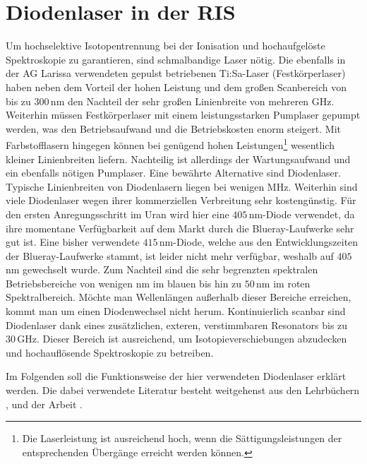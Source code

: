 \section{Diodenlaser in der RIS}\label{sec:diodenlaser}
Um hochselektive Isotopentrennung bei der Ionisation und hochaufgelöste
Spektroskopie zu garantieren, sind schmalbandige Laser nötig. Die ebenfalls in
der AG Larissa verwendeten gepulst betriebenen Ti:Sa-Laser (Festkörperlaser)
haben neben dem Vorteil der hohen Leistung und dem großen Scanbereich von bis
zu $300\,$nm den Nachteil der sehr großen Linienbreite von mehreren GHz.
Weiterhin müssen Festkörperlaser mit einem leistungsstarken Pumplaser gepumpt
werden, was den Betriebsaufwand und die Betriebskosten enorm steigert.
Mit Farbstofflasern hingegen können bei genügend hohen
Leistungen\footnote{Die Laserleistung ist ausreichend hoch, wenn die
Sättigungsleistungen der entsprechenden Übergänge erreicht werden können.}
wesentlich kleiner Linienbreiten liefern. Nachteilig ist allerdings der
Wartungsaufwand und ein ebenfalls nötigen Pumplaser. Eine bewährte Alternative
sind Diodenlaser. Typische Linienbreiten von Diodenlasern liegen bei wenigen
MHz. Weiterhin sind viele Diodenlaser wegen ihrer
kommerziellen Verbreitung sehr kostengünstig. Für den ersten Anregungsschritt im
Uran wird hier eine $405\,$nm-Diode verwendet, da ihre momentane Verfügbarkeit
auf dem Markt durch die Blueray-Laufwerke sehr gut ist. Eine bisher verwendete
$415\,$nm-Diode, welche aus den Entwicklungszeiten der Blueray-Laufwerke stammt,
ist leider nicht mehr verfügbar, weshalb auf $405\,$nm gewechselt wurde.
Zum Nachteil sind die sehr begrenzten spektralen Betriebsbereiche von
wenigen nm im blauen bis hin zu $50\,$nm im roten Spektralbereich. Möchte man
Wellenlängen außerhalb dieser Bereiche erreichen, kommt man um einen
Diodenwechsel nicht herum. Kontinuierlich scanbar sind Diodenlaser dank eines
zusätzlichen, exteren, verstimmbaren Resonators bis zu $30\,$GHz. Dieser Bereich
ist ausreichend, um Isotopieverschiebungen abzudecken und hochauflösende
Spektroskopie zu betreiben.\par
Im Folgenden soll die Funktionsweise der hier
verwendeten Diodenlaser erklärt werden. Die dabei verwendete Literatur besteht weitgehenst aus den
Lehrbüchern \cite{demtroeder:ex3}, \cite{chow:semiconductor-laser} und der
Arbeit \cite{schumann:2001:diplomarbeit}.

